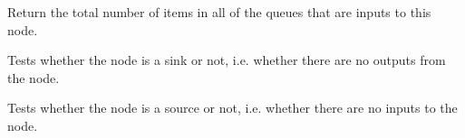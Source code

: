 \documentclass[letterpaper,10pt,english]{sphinxmanual}
\begin{document}
\begin{fulllineitems}
\begin{fulllineitems}
\end{fulllineitems}


\begin{fulllineitems}
\label{\detokenize{api:nanostream.node.NanoNode.input_queue_size}}
Return the total number of items in all of the queues that are inputs
to this node.

\end{fulllineitems}


\begin{fulllineitems}
\label{\detokenize{api:nanostream.node.NanoNode.is_sink}}
Tests whether the node is a sink or not, i.e. whether there are no
outputs from the node.

\end{fulllineitems}


\begin{fulllineitems}
\label{\detokenize{api:nanostream.node.NanoNode.is_source}}
Tests whether the node is a source or not, i.e. whether there are no
inputs to the node.

\end{fulllineitems}


\begin{fulllineitems}
\label{\detokenize{api:nanostream.node.NanoNode.kill_pipeline}}
\end{fulllineitems}


\begin{fulllineitems}
\label{\detokenize{api:nanostream.node.NanoNode.log_info}}
\end{fulllineitems}


\begin{fulllineitems}
\label{\detokenize{api:nanostream.node.NanoNode.logjam}}
\end{fulllineitems}


\end{fulllineitems}
\end{document}
